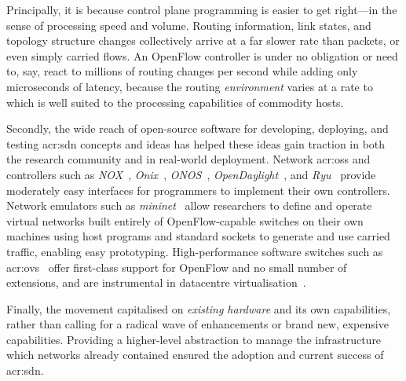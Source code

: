 Principally, it is because control plane programming is easier to get right---in the sense of processing speed and volume.
Routing information, link states, and topology structure changes collectively arrive at a far slower rate than packets, or even simply carried flows.
An OpenFlow controller is under no obligation or need to, say, react to millions of routing changes per second while adding only microseconds of latency, because the routing \emph{environment} varies at a rate to which is well suited to the processing capabilities of commodity hosts.

Secondly, the wide reach of open-source software for developing, deploying, and testing \gls{acr:sdn} concepts and ideas has helped these ideas gain traction in both the research community and in real-world deployment.
Network \glspl{acr:os} and controllers such as  \emph{NOX}~\parencite{DBLP:journals/ccr/GudeKPPCMS08}, \emph{Onix}~\parencite{DBLP:conf/osdi/KoponenCGSPZRIIHS10}, \emph{ONOS}~\parencite{onos}, \emph{OpenDaylight}~\parencite{opendaylight}, and \emph{Ryu}~\parencite{ryu} provide moderately easy interfaces for programmers to implement their own controllers.
Network emulators such as \emph{mininet}~\parencite{DBLP:conf/hotnets/LantzHM10} allow researchers to define and operate virtual networks built entirely of OpenFlow-capable switches on their own machines using host programs and standard sockets to generate and use carried traffic, enabling easy prototyping.
High-performance software switches such as \gls{acr:ovs}~\parencite{DBLP:conf/nsdi/PfaffPKJZRGWSSA15} offer first-class support for OpenFlow and no small number of extensions, and are instrumental in datacentre virtualisation~\parencite{DBLP:conf/sigcomm/TuWAP21}.

Finally, the movement capitalised on \emph{existing hardware} and its own capabilities, rather than calling for a radical wave of enhancements or brand new, expensive capabilities.
Providing a higher-level abstraction to manage the infrastructure which networks already contained ensured the adoption and current success of \gls{acr:sdn}.


